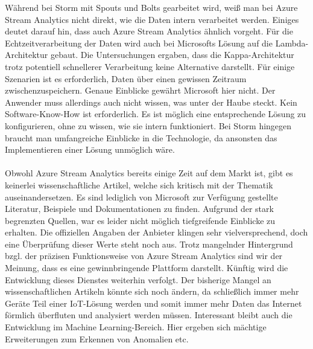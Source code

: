 Während bei Storm mit Spouts und Bolts gearbeitet wird, weiß man bei Azure Stream Analytics nicht direkt, wie die Daten intern verarbeitet werden. Einiges deutet darauf hin, dass auch Azure Stream Analytics ähnlich vorgeht. Für die Echtzeitverarbeitung der Daten wird auch bei Microsofts Lösung auf die Lambda-Architektur gebaut. Die Untersuchungen ergaben, dass die Kappa-Architektur trotz potentiell schnellerer Verarbeitung keine Alternative darstellt. Für einige Szenarien ist es erforderlich, Daten über einen gewissen Zeitraum zwischenzuspeichern. Genaue Einblicke gewährt Microsoft hier nicht. Der Anwender muss allerdings auch nicht wissen, was unter der Haube steckt. Kein Software-Know-How ist erforderlich. Es ist möglich eine entsprechende Lösung zu konfigurieren, ohne zu wissen, wie sie intern funktioniert. Bei Storm hingegen braucht man umfangreiche Einblicke in die Technologie, da ansonsten das Implementieren einer Lösung unmöglich wäre.\\ \\
Obwohl Azure Stream Analytics bereits einige Zeit auf dem Markt ist, gibt es keinerlei wissenschaftliche Artikel, welche sich kritisch mit der Thematik auseinandersetzen. Es sind lediglich von Microsoft zur Verfügung gestellte Literatur, Beispiele und Dokumentationen zu finden. Aufgrund der stark begrenzten Quellen, war es leider nicht möglich tiefgreifende Einblicke zu erhalten. Die offiziellen Angaben der Anbieter klingen sehr vielversprechend, doch eine Überprüfung dieser Werte steht noch aus. Trotz mangelnder Hintergrund bzgl. der präzisen Funktionsweise von Azure Stream Analytics sind wir der Meinung, dass es eine gewinnbringende Plattform darstellt.
Künftig wird die Entwicklung dieses Dienstes weiterhin verfolgt. Der bisherige Mangel an wissenschaftlichen Artikeln könnte sich noch ändern, da schließlich immer mehr Geräte Teil einer IoT-Lösung werden und somit immer mehr Daten das Internet förmlich überfluten und analysiert werden müssen. Interessant bleibt auch die Entwicklung im Machine Learning-Bereich. Hier ergeben sich mächtige Erweiterungen zum Erkennen von Anomalien etc.\\




\ifCLASSOPTIONcaptionsoff
  \newpage
\fi